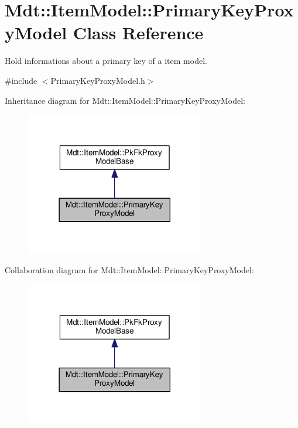\hypertarget{class_mdt_1_1_item_model_1_1_primary_key_proxy_model}{}\section{Mdt\+:\+:Item\+Model\+:\+:Primary\+Key\+Proxy\+Model Class Reference}
\label{class_mdt_1_1_item_model_1_1_primary_key_proxy_model}


Hold informations about a primary key of a item model.  




{\ttfamily \#include $<$Primary\+Key\+Proxy\+Model.\+h$>$}



Inheritance diagram for Mdt\+:\+:Item\+Model\+:\+:Primary\+Key\+Proxy\+Model\+:
\nopagebreak
\begin{figure}[H]
\begin{center}
\leavevmode
\includegraphics[width=222pt]{class_mdt_1_1_item_model_1_1_primary_key_proxy_model__inherit__graph}
\end{center}
\end{figure}


Collaboration diagram for Mdt\+:\+:Item\+Model\+:\+:Primary\+Key\+Proxy\+Model\+:
\nopagebreak
\begin{figure}[H]
\begin{center}
\leavevmode
\includegraphics[width=222pt]{class_mdt_1_1_item_model_1_1_primary_key_proxy_model__coll__graph}
\end{center}
\end{figure}
